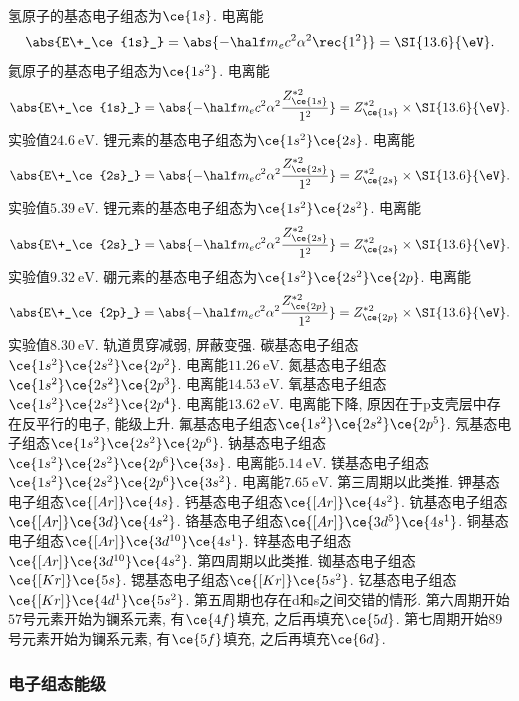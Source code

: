 \documentclass[hidelinks]{ctexart}
\begin{document}
\newpoint{}氢原子的基态电子组态为$\ce{1s}$. 电离能
\[ \abs{E\+_\ce{1s}_} = \abs{-\half m_e c^2 \alpha^2 \rec{1^2}} = \SI{13.6}{\eV}. \]
\newpoint{}氦原子的基态电子组态为$\ce{1s^2}$. 电离能
\[ \abs{E\+_\ce{1s}_} = \abs{-\half m_e c^2 \alpha^2 \frac{Z_{\ce{1s}}^{*2}}{1^2}} = Z_{\ce{1s}}^{*2}\times\SI{13.6}{\eV}. \]
实验值$\SI{24.6}{\eV}$.
\newpoint{}锂元素的基态电子组态为$\ce{1s^2}\ce{2s}$. 电离能
\[ \abs{E\+_\ce{2s}_} = \abs{-\half m_e c^2 \alpha^2 \frac{Z_{\ce{2s}}^{*2}}{1^2}} = Z_{\ce{2s}}^{*2}\times\SI{13.6}{\eV}. \]
实验值$\SI{5.39}{\eV}$.
\newpoint{}锂元素的基态电子组态为$\ce{1s^2}\ce{2s^2}$. 电离能
\[ \abs{E\+_\ce{2s}_} = \abs{-\half m_e c^2 \alpha^2 \frac{Z_{\ce{2s}}^{*2}}{1^2}} = Z_{\ce{2s}}^{*2}\times\SI{13.6}{\eV}. \]
实验值$\SI{9.32}{\eV}$.
\newpoint{}硼元素的基态电子组态为$\ce{1s^2}\ce{2s^2}\ce{2p}$. 电离能
\[ \abs{E\+_\ce{2p}_} = \abs{-\half m_e c^2 \alpha^2 \frac{Z_{\ce{2p}}^{*2}}{1^2}} = Z_{\ce{2p}}^{*2}\times\SI{13.6}{\eV}. \]
实验值$\SI{8.30}{\eV}$. 轨道贯穿减弱, 屏蔽变强.
\newpoint{}碳基态电子组态$\ce{1s^2}\ce{2s^2}\ce{2p^2}$. 电离能$\SI{11.26}{\eV}$.
\newpoint{}氮基态电子组态$\ce{1s^2}\ce{2s^2}\ce{2p^3}$. 电离能$\SI{14.53}{\eV}$.
\newpoint{}氧基态电子组态$\ce{1s^2}\ce{2s^2}\ce{2p^4}$. 电离能$\SI{13.62}{\eV}$. 电离能下降, 原因在于p支壳层中存在反平行的电子, 能级上升.
\newpoint{}氟基态电子组态$\ce{1s^2}\ce{2s^2}\ce{2p^5}$.
\newpoint{}氖基态电子组态$\ce{1s^2}\ce{2s^2}\ce{2p^6}$.
\newpoint{}钠基态电子组态$\ce{1s^2}\ce{2s^2}\ce{2p^6}\ce{3s}$. 电离能$\SI{5.14}{\eV}$.
\newpoint{}镁基态电子组态$\ce{1s^2}\ce{2s^2}\ce{2p^6}\ce{3s^2}$. 电离能$\SI{7.65}{\eV}$.
\newpoint{}第三周期以此类推.
\newpoint{}钾基态电子组态$\ce{[Ar]}\ce{4s}$.
\newpoint{}钙基态电子组态$\ce{[Ar]}\ce{4s^2}$.
\newpoint{}钪基态电子组态$\ce{[Ar]}\ce{3d}\ce{4s^2}$.
\newpoint{}铬基态电子组态$\ce{[Ar]}\ce{3d^{5}}\ce{4s^1}$.
\newpoint{}铜基态电子组态$\ce{[Ar]}\ce{3d^{10}}\ce{4s^1}$.
\newpoint{}锌基态电子组态$\ce{[Ar]}\ce{3d^{10}}\ce{4s^2}$.
\newpoint{}第四周期以此类推.
\newpoint{}铷基态电子组态$\ce{[Kr]}\ce{5s}$.
\newpoint{}锶基态电子组态$\ce{[Kr]}\ce{5s^2}$.
\newpoint{}钇基态电子组态$\ce{[Kr]}\ce{4d^1}\ce{5s^2}$.
\newpoint{}第五周期也存在d和s之间交错的情形.
\newpoint{}第六周期开始$57$号元素开始为镧系元素, 有$\ce{4f}$填充, 之后再填充$\ce{5d}$.
\newpoint{}第七周期开始$89$号元素开始为镧系元素, 有$\ce{5f}$填充, 之后再填充$\ce{6d}$.


\subsubsection{电子组态能级} %
\label{ssub:电子组态能级}
\end{document}
